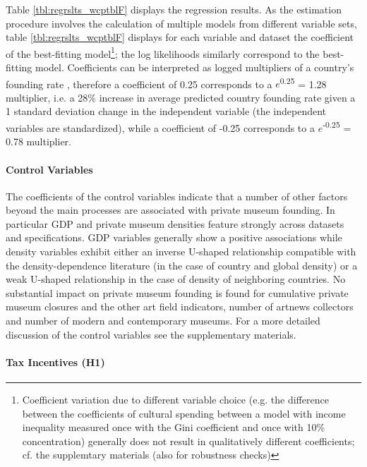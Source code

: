 \documentclass[11pt]{article}
\begin{document}
Table \ref{tbl:regrslts_wcptblF} displays the regression results. 
As the estimation procedure involves the calculation of multiple models from different variable sets, table \ref{tbl:regrslts_wcptblF} displays for each variable and dataset the coefficient of the best-fitting model\footnote{Coefficient variation due to different variable choice (e.g. the difference between the coefficients of cultural spending between a model with income inequality measured once with the Gini coefficient and once with 10\% concentration) generally does not result in qualitatively different coefficients; cf. the supplemtary materials (also for robustness checks)}; the log likelihoods similarly correspond to the best-fitting model. 
Coefficients can be interpreted as logged multipliers of a country's founding rate \parencite{Coxe_West_Aiken_2009_count}, therefore a coefficient of 0.25 corresponds to a \(e\)\textsuperscript{0.25} = 1.28 multiplier, i.e. a 28\% increase in average predicted country founding rate given a 1 standard deviation change in the independent variable (the independent variables are standardized), while a coefficient of -0.25 corresponds to a \(e\)\textsuperscript{-0.25} = 0.78 multiplier.
\FloatBarrier

\paragraph*{Control Variables}

The coefficients of the control variables indicate that a number of other factors beyond the main processes are associated with private museum founding.
In particular GDP and private museum densities feature strongly across datasets and specifications.
GDP variables generally show a positive associations while density variables exhibit either an inverse U-shaped relationship compatible with the density-dependence literature (in the case of country and global density) or a weak U-shaped relationship in the case of density of neighboring countries.
No substantial impact on private museum founding is found for cumulative private museum closures and the other art field indicators, number of artnews collectors and number of modern and contemporary museums.
For a more detailed discussion of the control variables see the supplementary materials. 



\paragraph*{Tax Incentives (H1)}
\end{document}
